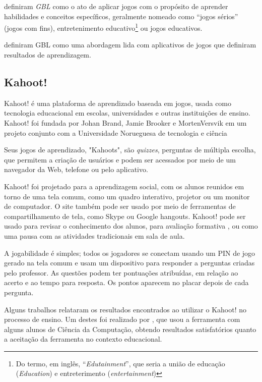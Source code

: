 \documentclass[
	12pt,				%
	openright,			%
	oneside,
	a4paper,			%
	english,			%
	french,				%
	spanish,			%
	brazil,				%
	]{abntex2}
\begin{document}
 definiram \textit{GBL} como o ato de aplicar jogos com o propósito de aprender habilidades e conceitos específicos, geralmente nomeado como “jogos sérios” (jogos com
fins), entretenimento educativo\footnote{Do termo, em inglês, “\textit{Edutainment}”, que seria a união de educação (\textit{Education}) e entreterimento (\textit{entertainment})} ou jogos educativos.

 definiram GBL como uma abordagem lida com aplicativos de jogos que definiram resultados de aprendizagem.

\subsection{Kahoot!}
\label{sec:Kahoot!}
Kahoot! é uma plataforma de aprendizado baseada em jogos, usada como tecnologia educacional em escolas, universidades e outras instituições de ensino. Kahoot! foi fundada por Johan Brand, Jamie Brooker e MortenVersvik em um projeto conjunto com a Universidade Norueguesa de tecnologia e ciência \cite{kahoot2018}

Seus jogos de aprendizado, "Kahoots", são \textit{quizzes}, perguntas de múltipla escolha, que permitem a criação de usuários e podem ser acessados por meio de um navegador da Web, telefone ou pelo aplicativo.

Kahoot! foi projetado para a aprendizagem social, com os alunos reunidos em torno de uma tela comum, como um quadro interativo, projetor ou um monitor de computador. O site também pode ser usado por meio de ferramentas de compartilhamento de tela, como Skype ou Google hangouts. Kahoot! pode ser usado para revisar o conhecimento dos alunos, para avaliação formativa \cite{kahootFormative}, ou como uma pausa com as atividades tradicionais em sala de aula. 

A jogabilidade é simples; todos os jogadores se conectam usando um PIN de jogo gerado na tela comum e usam um dispositivo para responder a perguntas criadas pelo professor. As questões podem ter pontuações atribuídas, em relação ao acerto e ao tempo para resposta. Os pontos aparecem no placar depois de cada pergunta.

Alguns trabalhos relataram os resultados encontrados ao utilizar o Kahoot! no processo de ensino. Um destes foi realizado por , que usou a ferramenta com alguns alunos de Ciência da Computação, obtendo resultados satisfatórios quanto a aceitação da ferramenta no contexto educacional.
\end{document}
